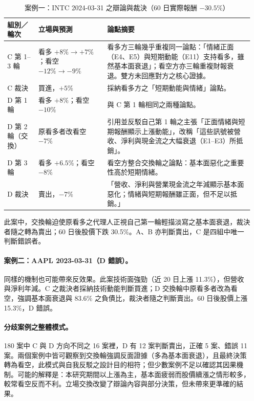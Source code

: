 \documentclass[12pt,a4paper]{article}
\newcommand{\grp}[1]{\textsf{#1}}
\begin{document}
\begin{CJK}{UTF8}{bkai}
\begin{table}[H]
\centering\small
\caption{案例一：INTC 2024-03-31 之辯論與裁決（60 日實際報酬 $-30.5\%$）}
\label{tab:case}
\begin{tabularx}{\textwidth}{@{}l l Y@{}}
\toprule
組別／輪次 & 立場與預測 & 論點摘要 \\
\midrule
\grp{C} 第 1--3 輪 & 看多 $+8\%\rightarrow+7\%$；看空 $-12\%\rightarrow-9\%$ & 看多方三輪幾乎重複同一論點：「情緒正面（E4、E5）與短期動能（E11）支持看多，雖然基本面衰退」；看空方亦三輪重複財報衰退。雙方未回應對方之核心證據。 \\
\grp{C} 裁決 & 買進，$+5\%$ & 採納看多方之「短期動能與情緒」論點。 \\
\midrule
\grp{D} 第 1 輪 & 看多 $+8\%$；看空 $-10\%$ & 與 \grp{C} 第 1 輪相同之兩種論點。 \\
\grp{D} 第 2 輪（交換） & 原看多者改看空 $-7\%$ & 引用並反駁自己第 1 輪之主張「正面情緒與短期報酬顯示上漲動能」，改稱「這些訊號被營收、淨利與現金流之大幅衰退（E1--E3）所抵銷」。 \\
\grp{D} 第 3 輪 & 看多 $+6.5\%$；看空 $-8\%$ & 看空方整合交換輪之論點：基本面惡化之重要性高於短期情緒。 \\
\grp{D} 裁決 & 賣出，$-7\%$ & 「營收、淨利與營業現金流之年減顯示基本面惡化；情緒與短期報酬雖正面，但不足以抵銷。」 \\
\bottomrule
\end{tabularx}
\end{table}

此案中，交換輪迫使原看多之代理人正視自己第一輪輕描淡寫之基本面衰退，裁決者隨之轉為賣出；60 日後股價下跌 30.5\%。\grp{A}、\grp{B} 亦判斷賣出，\grp{C} 是四組中唯一判斷錯誤者。

\paragraph{案例二：AAPL 2023-03-31（\grp{D} 錯誤）。} 同樣的機制也可能帶來反效果。此案技術面強勁（近 20 日上漲 11.3\%），但營收與淨利年減。\grp{C} 之裁決者採納技術動能判斷買進；\grp{D} 交換輪中原看多者改為看空，強調基本面衰退與 83.6\% 之負債比，裁決者隨之判斷賣出。60 日後股價上漲 15.3\%，\grp{D} 錯誤。

\paragraph{分歧案例之整體模式。} 180 案中 \grp{C} 與 \grp{D} 方向不同之 16 案裡，\grp{D} 有 12 案判斷賣出，正確 5 案、錯誤 11 案。兩個案例中皆可觀察到交換輪強調反面證據（多為基本面衰退），且最終決策轉為看空，此模式與自我反駁之設計目的相符；但少數案例不足以確認其因果機制。可能的解釋是：本研究期間以上漲為主，基本面疲弱而股價續漲之情形較多，較常看空反而不利。立場交換改變了辯論內容與部分決策，但未帶來更準確的結果。


\end{CJK}
\end{document}
